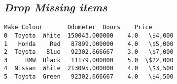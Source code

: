 \documentclass[11pt]{article}
\begin{document}
    \hypertarget{drop-missing-items}{%
\subsection{\texorpdfstring{\textbf{\emph{Drop Missing
items}}}{Drop Missing items}}\label{drop-missing-items}}

            \begin{tcolorbox}[breakable, size=fbox, boxrule=.5pt, pad at break*=1mm, opacityfill=0]
\begin{Verbatim}[commandchars=\\\{\}]
     Make Colour       Odometer  Doors    Price
0  Toyota  White  150043.000000    4.0   \$4,000
1   Honda    Red   87899.000000    4.0   \$5,000
2  Toyota   Blue   92302.666667    3.0   \$7,000
3     BMW  Black   11179.000000    5.0  \$22,000
4  Nissan  White  213095.000000    4.0   \$3,500
5  Toyota  Green   92302.666667    4.0   \$4,500
\end{Verbatim}
\end{tcolorbox}
        

    
    
    
\end{document}
